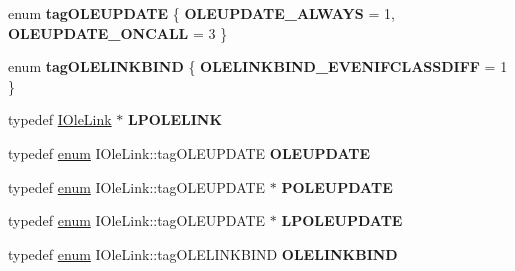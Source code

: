 \begin{DoxyCompactItemize}
\item 
\mbox{\label{interface_i_ole_link_a44a19e0daca1d4c1c03805951c29474d}} 
enum {\bfseries tag\+O\+L\+E\+U\+P\+D\+A\+TE} \{ {\bfseries O\+L\+E\+U\+P\+D\+A\+T\+E\+\_\+\+A\+L\+W\+A\+YS} = 1, 
{\bfseries O\+L\+E\+U\+P\+D\+A\+T\+E\+\_\+\+O\+N\+C\+A\+LL} = 3
 \}
\item 
\mbox{\label{interface_i_ole_link_aed4aa8a668b0655281c51ed9a9467849}} 
enum {\bfseries tag\+O\+L\+E\+L\+I\+N\+K\+B\+I\+ND} \{ {\bfseries O\+L\+E\+L\+I\+N\+K\+B\+I\+N\+D\+\_\+\+E\+V\+E\+N\+I\+F\+C\+L\+A\+S\+S\+D\+I\+FF} = 1
 \}
\item 
\mbox{\label{interface_i_ole_link_a1ea01d11b3865c29ad2d674aa9daffe5}} 
typedef \hyperlink{interface_i_ole_link}{I\+Ole\+Link} $\ast$ {\bfseries L\+P\+O\+L\+E\+L\+I\+NK}
\item 
\mbox{\label{interface_i_ole_link_ad6f210e65a1bc3d98bcfb6aa0add42f8}} 
typedef \hyperlink{interfaceenum}{enum} I\+Ole\+Link\+::tag\+O\+L\+E\+U\+P\+D\+A\+TE {\bfseries O\+L\+E\+U\+P\+D\+A\+TE}
\item 
\mbox{\label{interface_i_ole_link_a1e611de4ae59dad9987aa85d7e946c40}} 
typedef \hyperlink{interfaceenum}{enum} I\+Ole\+Link\+::tag\+O\+L\+E\+U\+P\+D\+A\+TE $\ast$ {\bfseries P\+O\+L\+E\+U\+P\+D\+A\+TE}
\item 
\mbox{\label{interface_i_ole_link_a51ef61fee310134a0ec0d4fb3a70fee0}} 
typedef \hyperlink{interfaceenum}{enum} I\+Ole\+Link\+::tag\+O\+L\+E\+U\+P\+D\+A\+TE $\ast$ {\bfseries L\+P\+O\+L\+E\+U\+P\+D\+A\+TE}
\item 
\mbox{\label{interface_i_ole_link_a99c7fbf42cfa470b1c5118beacfd88c9}} 
typedef \hyperlink{interfaceenum}{enum} I\+Ole\+Link\+::tag\+O\+L\+E\+L\+I\+N\+K\+B\+I\+ND {\bfseries O\+L\+E\+L\+I\+N\+K\+B\+I\+ND}
\end{DoxyCompactItemize}
